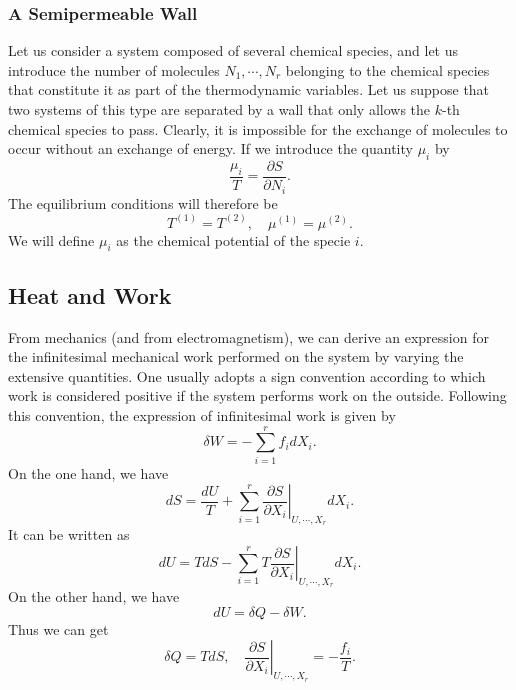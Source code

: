 \subsubsection{A Semipermeable Wall}
Let us consider a system composed of several chemical species, and let us introduce the number of molecules $N_1, \cdots, N_{r}$ belonging to the chemical species that constitute it as part of the thermodynamic variables. Let us suppose that two systems of this type are separated by a wall that only allows the $k$-th chemical species to pass. Clearly, it is impossible for the exchange of molecules to occur without an exchange of energy. If we introduce the quantity $\mu_i$ by
\[\frac{\mu_i}{T} =  \frac{\partial S}{\partial N_i} .\]
The equilibrium conditions will therefore be
\[T^{(1)} = T^{(2)} , \quad \mu^{(1)} = \mu^{(2)}.\]
We will define $\mu_i$ as the chemical potential of the specie $i$.

\subsection{Heat and Work}
From mechanics (and from electromagnetism), we can derive an expression for the infinitesimal mechanical work performed on the system by varying the extensive quantities. One usually adopts a sign convention according to which work is considered positive if the system performs work on the outside. Following this convention, the expression of infinitesimal work is given by
\[\delta W  =  -\sum_{i = 1}^{r} f_i dX_i.\]
On the one hand, we have
\[dS = \frac{dU}{T} + \sum_{i = 1}^{r} \left. \frac{\partial S}{\partial X_i} \right|_{U,\cdots,X_r} dX_i.\]
It can be written as
\[dU = TdS - \sum_{i = 1}^{r} \left. T \frac{\partial S}{\partial X_i} \right|_{U,\cdots,X_r} dX_i.\]
On the other hand, we have
\[dU = \delta Q - \delta W.\]
Thus we can get
\[\delta Q = TdS , \quad \left. \frac{\partial S}{\partial X_i} \right|_{U,\cdots,X_r} = - \frac{f_i}{T}.\]

